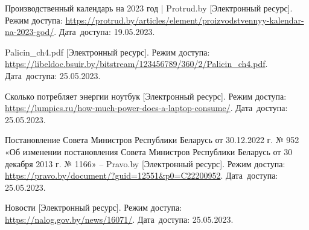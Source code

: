 \begin{thebibliography}{}

    Производственный календарь на 2023 год | Protrud.by
    [Электронный ресурс].
    Режим доступа: \url{https://protrud.by/articles/element/proizvodstvennyy-kalendar-na-2023-god/}.
    Дата~доступа: 19.05.2023.

    Palicin\_ch4.pdf
    [Электронный ресурс].
    Режим доступа: \url{https://libeldoc.bsuir.by/bitstream/123456789/360/2/Palicin_ch4.pdf}.
    Дата~доступа: 25.05.2023.

    Сколько потребляет энергии ноутбук
    [Электронный ресурс].
    Режим доступа: \url{https://lumpics.ru/how-much-power-does-a-laptop-consume/}.
    Дата~доступа: 25.05.2023.
    
    Постановление Совета Министров Республики Беларусь от 30.12.2022 г. № 952 «Об изменении постановления Совета Министров Республики Беларусь от 30 декабря 2013 г. № 1166» – Pravo.by
    [Электронный ресурс].
    Режим доступа: \url{https://pravo.by/document/?guid=12551&p0=C22200952}.
    Дата~доступа: 25.05.2023.

    Новости
    [Электронный ресурс].
    Режим доступа: \url{https://nalog.gov.by/news/16071/}.
    Дата~доступа: 25.05.2023.
\end{thebibliography}
\endgroup

\newpage
